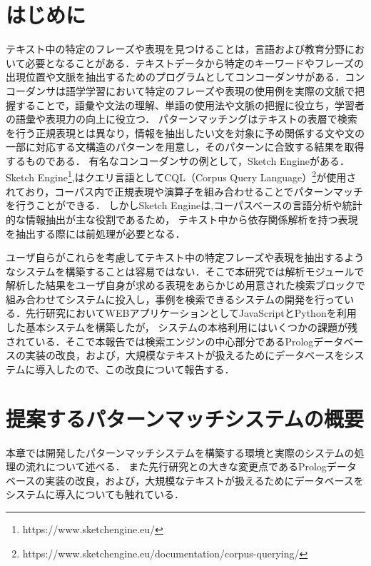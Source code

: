 \documentclass{FITpaper}
\begin{document}
\maketitle

\section{はじめに}
テキスト中の特定のフレーズや表現を見つけることは，言語および教育分野において必要となることがある．テキストデータから特定のキーワードやフレーズの出現位置や文脈を抽出するためのプログラムとしてコンコーダンサがある．コンコーダンサは語学学習において特定のフレーズや表現の使用例を実際の文脈で把握することで，語彙や文法の理解、単語の使用法や文脈の把握に役立ち，学習者の語彙や表現力の向上に役立つ．
パターンマッチングはテキストの表層で検索を行う正規表現とは異なり，情報を抽出したい文を対象に予め関係する文や文の一部に対応する文構造のパターンを用意し，そのパターンに合致する結果を取得するものである．
有名なコンコーダンサの例として，Sketch Engineがある．Sketch Engine\footnote{https://www.sketchengine.eu/},はクエリ言語としてCQL（Corpus Query Language）\footnote{https://www.sketchengine.eu/documentation/corpus-querying/}が使用されており，コーパス内で正規表現や演算子を組み合わせることでパターンマッチを行うことができる．
しかしSketch Engineは,コーパスベースの言語分析や統計的な情報抽出が主な役割であるため，
テキスト中から依存関係解析を持つ表現を抽出する際には前処理が必要となる．

ユーザ自らがこれらを考慮してテキスト中の特定フレーズや表現を抽出するようなシステムを構築することは容易ではない．そこで本研究では解析モジュールで解析した結果をユーザ自身が求める表現をあらかじめ用意された検索ブロックで組み合わせてシステムに投入し，事例を検索できるシステムの開発を行っている．先行研究においてWEBアプリケーションとしてJavaScriptとPythonを利用した基本システムを構築したが，
システムの本格利用にはいくつかの課題が残されている．そこで本報告では検索エンジンの中心部分であるPrologデータベースの実装の改良，および，大規模なテキストが扱えるためにデータベースをシステムに導入したので、この改良について報告する．


\section{提案するパターンマッチシステムの概要}
本章では開発したパターンマッチシステムを構築する環境と実際のシステムの処理の流れについて述べる．
また先行研究との大きな変更点であるPrologデータベースの実装の改良，および，大規模なテキストが扱えるためにデータベースをシステムに導入についても触れている．
\end{document}
